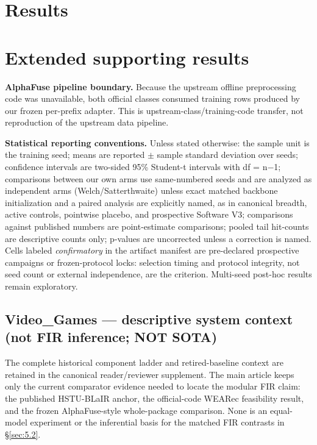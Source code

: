 \ifmainpaper
\section{Results}\label{sec:5}
\else
\section{Extended supporting results}\label{sec:supp-results}
\fi

\textbf{AlphaFuse pipeline boundary.} Because the upstream offline preprocessing code was unavailable, both official classes consumed training rows produced by our frozen per-prefix adapter. This is upstream-class/training-code transfer, not reproduction of the upstream data pipeline.

\textbf{Statistical reporting conventions.} Unless stated otherwise: the sample unit is the training seed; means are reported \ensuremath{\pm} sample standard deviation over seeds; confidence intervals are two-sided 95\% Student-t intervals with df = n\ensuremath{-}1; comparisons between our own arms use same-numbered seeds and are analyzed as independent arms (Welch/Satterthwaite) unless exact matched backbone initialization and a paired analysis are explicitly named, as in canonical breadth, active controls, pointwise placebo, and prospective Software V3; comparisons against published numbers are point-estimate comparisons; pooled tail hit-counts are descriptive counts only; p-values are uncorrected unless a correction is named. Cells labeled \emph{confirmatory} in the artifact manifest are pre-declared prospective campaigns or frozen-protocol locks: selection timing and protocol integrity, not seed count or external independence, are the criterion. Multi-seed post-hoc results remain exploratory.


\ifmainpaper
\subsection{Video\_Games --- descriptive system context (not FIR inference; NOT SOTA)}\label{sec:5.1}

The complete historical component ladder and retired-baseline context are retained in
the canonical reader/reviewer supplement.  The main article keeps only the current
comparator evidence needed to locate the modular FIR claim: the published HSTU-BLaIR
anchor, the official-code WEARec feasibility result, and the frozen AlphaFuse-style
whole-package comparison.  None is an equal-model experiment or the inferential basis
for the matched FIR contrasts in \S\ref{sec:5.2}.

